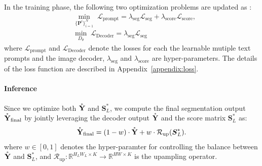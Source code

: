 \documentclass[nohyperref]{article}
\newcommand{\add}[1] {\textcolor{blue}{#1}} %
\newcommand{\bs}{\boldsymbol}
\newcommand{\asty}{\accentset{\ast}{\mathbf{Y}}}
\newcommand{\gty}{\mbf{Y}^{\text{gt}}}
\newcommand{\mbf}{\mathbf}
\theoremstyle{plain}
\theoremstyle{definition}
\theoremstyle{remark}
\begin{document}
In the training phase, the following two optimization problems are updated as :
\begin{align}
&\underset{\{\bs{P}^i\}_{i=1}^N} \min \;\mathcal{L}_{\text{prompt}} = \lambda_{\text{seg}} \mathcal{L}_{\text{seg}} + \lambda_{\text{score}} \mathcal{L}_{\text{score}}, \\ &\underset{D_{\theta}} \min \; \mathcal{L}_{\text{Decoder}} = \lambda_{\text{seg}} \mathcal{L}_{\text{seg}}
\label{seg,score_loss}
\end{align}
where $\mathcal{L}_{\text{prompt}}$ and $\mathcal{L}_{\text{Decoder}}$ denote the losses for each the learnable mutiple text prompts and the image decoder, $\lambda_{\text{seg}}$ and $\lambda_{\text{score}}$ are hyper-parameters.
The details of the loss function are described in Appendix~\ref{appendix:loss}. 

\paragraph{Inference}
{Since we optimize both $\asty$ and $\bs{S}^{\ast}_L$, we compute the final segmentation output $\asty_{\text{final}}$ by jointly leveraging the decoder output $\asty$ and the score matrix $\bs{S}^{\ast}_L$ as: 
\begin{eqnarray}
	\asty_{\text{final}} = (1-w) \cdot \asty + w \cdot \mathcal{R}_{\text{up}}(\bs{S}^{\ast}_L).
	\label{eq:final_predict}
\end{eqnarray}
where $w \in [0,1] $ denotes the hyper-paramter for controlling the balance between $\asty$ and $\bs{S}^{\ast}_L$, and $\mathcal{R}_{\text{up}}:\mathbb{R}^{H_LW_L\times K} \rightarrow \mathbb{R}^{H  W\times K} $ is the upampling operator.
}



\end{document}

